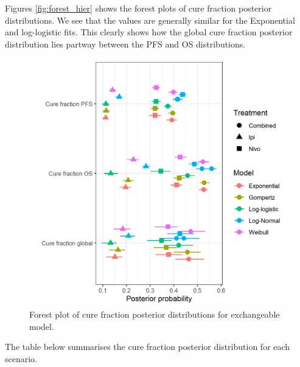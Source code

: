 \documentclass[
]{article}
\begin{document}
Figures \ref{fig:forest_hier} shows the forest plots of cure fraction
posterior distributions. We see that the values are generally similar
for the Exponential and log-logistic fits. This clearly shows how the
global cure fraction posterior distribution lies partway between the PFS
and OS distributions.

\begin{figure}

{\centering \includegraphics[width=0.6\linewidth]{../plots/cf hier_bg_fixed_forest_plot} 

}

\caption{\label{fig:forest_hier}Forest plot of cure fraction posterior distributions for exchangeable model.}\label{fig:unnamed-chunk-10}
\end{figure}

The table below summarises the cure fraction posterior distribution for
each scenario.
\end{document}
